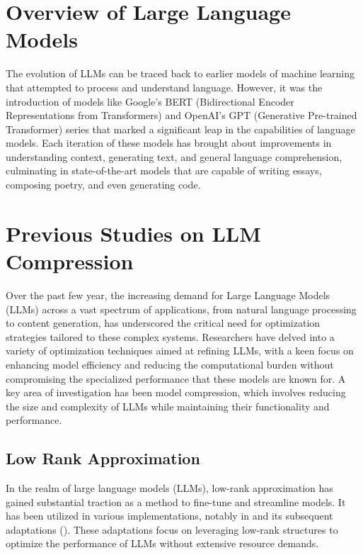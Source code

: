\section{Overview of Large Language Models}
The evolution of LLMs can be traced back to earlier models of machine learning that attempted to process and understand language. However, it was the introduction of models like Google's BERT (Bidirectional Encoder Representations from Transformers) and OpenAI's GPT (Generative Pre-trained Transformer) series that marked a significant leap in the capabilities of language models. Each iteration of these models has brought about improvements in understanding context, generating text, and general language comprehension, culminating in state-of-the-art models that are capable of writing essays, composing poetry, and even generating code.

\section{Previous Studies on LLM Compression}
    Over the past few year, the increasing demand for Large Language Models (LLMs) across a vast spectrum of applications, from natural language processing to content generation, has underscored the critical need for optimization strategies tailored to these complex systems. Researchers have delved into a variety of optimization techniques aimed at refining LLMs, with a keen focus on enhancing model efficiency and reducing the computational burden without compromising the specialized performance that these models are known for.
    A key area of investigation has been model compression, which involves reducing the size and complexity of LLMs while maintaining their functionality and performance. \\

    \subsection*{Low Rank Approximation}
        In the realm of large language models (LLMs), low-rank approximation has gained substantial traction as a method to fine-tune and streamline models. It has been utilized in various implementations, notably in \cite{hu2021lora} and its subsequent adaptations (\cite{valipour-etal-2023-dylora, zhang2023adaptive, chavan2024oneforall}). These adaptations focus on leveraging low-rank structures to optimize the performance of LLMs without extensive resource demands.
        
